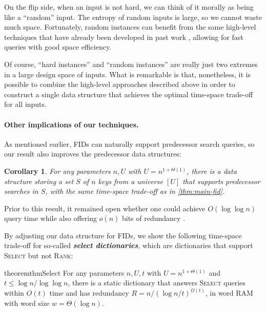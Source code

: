 \documentclass{article}
\theoremstyle{plain}
\newtheorem{cor}[theorem]{Corollary}
\theoremstyle{definition}  \newtheorem{definition}[theorem]{Definition}
\newcommand{\rank}{\textup{\textsc{Rank}}\xspace}
\newcommand{\select}{\textup{\textsc{Select}}\xspace}
\newcommand{\defn}[1]{\emph{\textbf{#1}}}
\begin{document}
On the flip side, when an input is not hard, we can think of it morally as being like a ``random'' input. The entropy of random inputs is large, so we cannot waste much space. Fortunately, random instances can benefit from the same high-level techniques that have already been developed in past work \cite{patrascu2008succincter}, allowing for fast queries with good space efficiency. 

Of course, ``hard instances'' and ``random instances'' are really just two extremes in a large design space of inputs. What is remarkable is that, nonetheless, it is possible to combine the high-level approaches described above in order to construct a single data structure that achieves the optimal time-space trade-off for all inputs. 

\paragraph{Other implications of our techniques.}

As mentioned earlier, FIDs can naturally support predecessor search queries, so our result also improves the predecessor data structures:

\begin{cor}
    \label{cor:predecessor}
    For any parameters $n, U$ with $U = n^{1+\Theta(1)}$, there is a data structure storing a set $S$ of $n$ keys from a universe $[U]$ that supports predecessor searches in $S$, with the same time-space trade-off as in \cref{thm:main-fid}.
\end{cor}

Prior to this result, it remained open whether one could achieve $O(\log \log n)$ query time while also offering $o(n)$ bits of redundancy \cite{pibiri2017dynamic}.

\smallskip

By adjusting our data structure for FIDs, we show the following time-space trade-off for so-called \defn{select dictionaries}, which are dictionaries that support \select but not \rank:

\begin{restatable}{theorem}{thmSelect}
  \label{thm:select}
  For any parameters $n, U, t$ with $U = n^{1 + \Theta(1)}$ and $t \le \log n / \log \log n$, there is a static dictionary that answers \textup{\select} queries within $O(t)$ time and has redundancy $R = n / (\log n / t)^{\Omega(t)}$, in word RAM with word size $w = \Theta(\log n)$.
\end{restatable}
\end{document}
